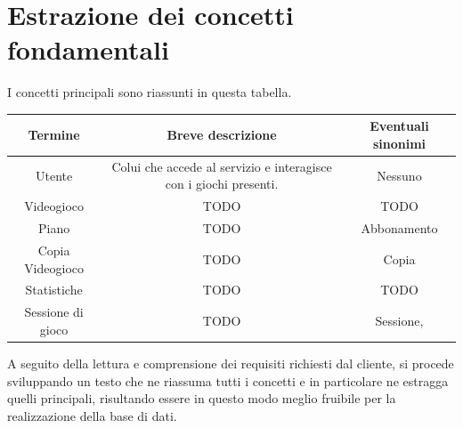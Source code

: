 \documentclass[a4paper,12pt]{report}
\begin{document}
\section{Estrazione dei concetti fondamentali}

I concetti principali sono riassunti in questa tabella.

\begin{center}
	\begin{tabular}{ |c|c|c| }
	\hline
	Termine & Breve descrizione & Eventuali sinonimi \\
	\hline
	Utente & Colui che accede al servizio e interagisce con i giochi presenti. & Nessuno \\
	\hline	
	Videogioco & TODO & TODO \\
	\hline
	Piano & TODO & Abbonamento \\
	\hline
	Copia Videogioco & TODO & Copia \\
	\hline
	Statistiche & TODO & TODO \\
	\hline
	Sessione di gioco & TODO & Sessione, \\
	\hline
	\end{tabular}
\end{center}

A seguito della lettura e comprensione dei requisiti richiesti dal cliente, si procede sviluppando un testo che
ne riassuma tutti i concetti e in particolare ne estragga quelli principali, risultando essere in questo modo
meglio fruibile per la realizzazione della base di dati.\\\\
\end{document}
